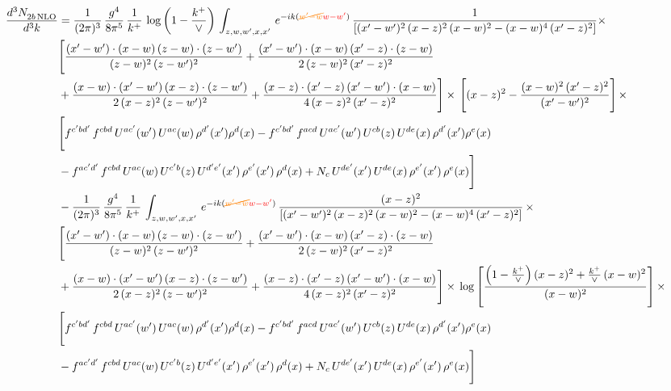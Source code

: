 \documentclass[9pt]{article}
\numberwithin{equation}{section}
\begin{document}
\begin{align}
    \frac{d^{3}N_{2b\,\rm NLO}^{\rm}}{d^{3}k}  & =  \frac{1}{(2\pi)^{3}}\, \frac{g^{4}}{8\pi^{5}}\,\frac{1}{k^{+}}\,\log{\left(1-\frac{k^{+}}{\vee}\right)}\,\int_{z,w,w^{\prime},x,x'}\, e^{-ik({\color{orange}\cancel{w^{\prime}-w}}{\color{red}w-w^{\prime}})}\, \frac{1}{\left[(x'-w')^{2}\,(x-z)^{2}\,(x-w)^{2} - (x-w)^{4}\, (x'-z)^{2}\right]} \times\notag \\ & \Bigg[\frac{(x'-w')\cdot (x-w)\, (z-w)\cdot (z-w')}{(z-w)^{2}\, (z-w')^{2}}+\frac{(x'-w')\cdot (x-w)\, (x'-z)\cdot (z-w)}{2\, (z-w)^{2}\, (x'-z)^{2}}\notag \\ & +\frac{(x-w)\cdot (x'-w')\, (x-z)\cdot (z-w')}{2\, (x-z)^{2}\, (z-w')^{2}}+\frac{(x-z)\cdot (x'-z)\, (x'-w')\cdot (x-w)}{4\, (x-z)^{2}\, (x'-z)^{2}}\Bigg] \times\,\Bigg[(x-z)^{2} - \frac{(x-w)^{2}\, (x'-z)^{2}}{(x'-w')^{2}}\Bigg]\,\times \notag \\ & \Bigg[f^{c'bd'}\,f^{cbd}\, U^{ac'}(w')\,U^{ac}(w)\,\rho^{d'}(x')\rho^{d}(x)- f^{c'bd'}\,f^{acd}\,U^{ac'}(w')\,U^{cb}(z)\,U^{de}(x)\,\rho^{d'}(x')\rho^{e}(x) \notag \\ & -f^{ac'd'}\,f^{cbd}\,U^{ac}(w)\,U^{c'b}(z)\,U^{d'e'}(x')\,\rho^{e'}(x')\,\rho^{d}(x) +N_{c}\,U^{de'}(x')\,U^{de}(x)\,\rho^{e'}(x')\,\rho^{e}(x)\Bigg] \notag \\
&  - \frac{1}{(2\pi)^{3}}\, \frac{g^{4}}{8\pi^{5}}\,\frac{1}{k^{+}}\,\int_{z,w,w^{\prime},x,x'}\, e^{-ik({\color{orange}\cancel{w^{\prime}-w}}{\color{red}w-w^{\prime}})}\, \frac{(x-z)^{2}}{\left[(x'-w')^{2}\,(x-z)^{2}\,(x-w)^{2} - (x-w)^{4}\, (x'-z)^{2}\right]}\,  \times\notag \\ & \Bigg[\frac{(x'-w')\cdot (x-w)\, (z-w)\cdot (z-w')}{(z-w)^{2}\, (z-w')^{2}}+\frac{(x'-w')\cdot (x-w)\, (x'-z)\cdot (z-w)}{2\, (z-w)^{2}\, (x'-z)^{2}}\notag \\ & +\frac{(x-w)\cdot (x'-w')\, (x-z)\cdot (z-w')}{2\, (x-z)^{2}\, (z-w')^{2}}+\frac{(x-z)\cdot (x'-z)\, (x'-w')\cdot (x-w)}{4\, (x-z)^{2}\, (x'-z)^{2}}\Bigg] \times\,\log{\left[\frac{\left(1-\frac{k^{+}}{\vee}\right)(x-z)^{2}+\frac{k^{+}}{\vee}\,(x-w)^{2}}{(x-w)^{2}}\right]}\,\times \notag \\ & \Bigg[f^{c'bd'}\,f^{cbd}\, U^{ac'}(w')\,U^{ac}(w)\,\rho^{d'}(x')\rho^{d}(x)- f^{c'bd'}\,f^{acd}\,U^{ac'}(w')\,U^{cb}(z)\,U^{de}(x)\,\rho^{d'}(x')\rho^{e}(x) \notag \\ & -f^{ac'd'}\,f^{cbd}\,U^{ac}(w)\,U^{c'b}(z)\,U^{d'e'}(x')\,\rho^{e'}(x')\,\rho^{d}(x) +N_{c}\,U^{de'}(x')\,U^{de}(x)\,\rho^{e'}(x')\,\rho^{e}(x)\Bigg] \notag \\

\end{align}
\end{document}
